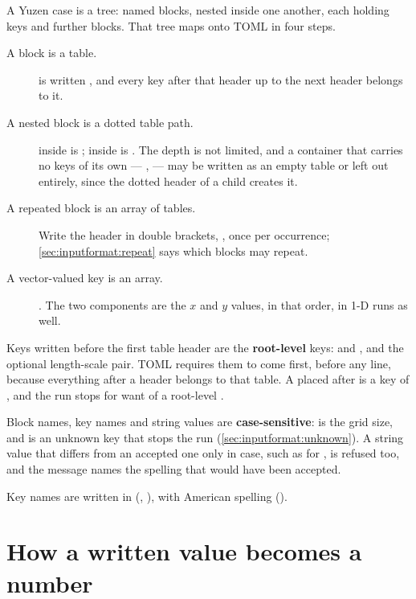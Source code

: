 A Yuzen case is a tree: named blocks, nested inside one another, each holding
keys and further blocks. That tree maps onto TOML in four steps.

\begin{description}
  \item[A block is a table.]  is written \code{[Grid]}, and every
    key after that header up to the next header belongs to it.
  \item[A nested block is a dotted table path.]  inside
     is ;  inside
     is . The depth is not limited,
    and a container that carries no keys of its own ---
    \code{[Initial]}, \code{[Physics]} --- may be written as an empty table
    or left out entirely, since the dotted header of a child creates it.
  \item[A repeated block is an array of tables.] Write the header in double
    brackets, , once per occurrence;
    \cref{sec:inputformat:repeat} says which blocks may repeat.
  \item[A vector-valued key is an array.] . The two
    components are the $x$ and $y$ values, in that order, in 1-D runs as well.
\end{description}

Keys written before the first table header are the \textbf{root-level} keys:
 and , and the optional length-scale pair. TOML
requires them to come first, before any \code{[...]} line, because everything
after a header belongs to that table. A  placed after
\code{[Grid]} is a key of , and the run stops for want of a
root-level .

Block names, key names and string values are \textbf{case-sensitive}:
 is the grid size, and  is an unknown key that stops the run
(\cref{sec:inputformat:unknown}). A string value that differs from an accepted
one only in case, such as  for , is refused too, and the
message names the spelling that would have been accepted.

Key names are written in  (,
), with American spelling ().

\section{How a written value becomes a number}
\label{sec:inputformat:types}

